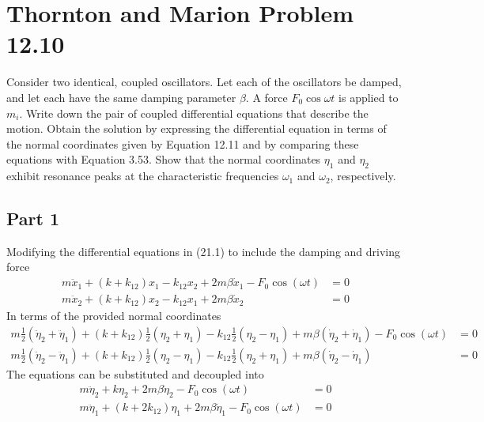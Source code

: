 \pagebreak
\section{Thornton and Marion Problem 12.10}
Consider two identical, coupled oscillators. Let each of the oscillators be damped, and let each have the same damping parameter $\beta$. A force $F_0\cos \omega t$ is applied to $m_i$. Write down the pair of coupled differential equations that describe the motion. Obtain the solution by expressing the differential equation in terms of the normal coordinates given by Equation 12.11 and by comparing these equations with Equation 3.53. Show that the normal coordinates $\eta_1$ and $\eta_2$ exhibit resonance peaks at the characteristic frequencies $\omega_1$ and $\omega_2$, respectively.

\subsection{Part 1}
Modifying the differential equations in (21.1) to include the damping and driving force
\begin{equation}
    \begin{split}
        m\ddot{x}_1 + (k+k_{12})x_1-k_{12}x_2+2m\beta\dot{x}_1-F_0 \cos (\omega t) &= 0\\
        m\ddot{x}_2 + (k+k_{12})x_2-k_{12}x_1+2m\beta\dot{x}_2 &= 0
    \end{split}
\end{equation}
In terms of the provided normal coordinates
\begin{equation}
    \begin{split}
        m\frac{1}{2}(\ddot{\eta}_2+\ddot{\eta}_1) + (k+k_{12})\frac{1}{2}(\eta_2+\eta_1)-k_{12}\frac{1}{2}(\eta_2-\eta_1)+m\beta(\dot{\eta}_2+\dot{\eta}_1)-F_0 \cos (\omega t) &= 0\\
        m\frac{1}{2}(\ddot{\eta}_2-\ddot{\eta}_1) + (k+k_{12})\frac{1}{2}(\eta_2-\eta_1)-k_{12}\frac{1}{2}(\eta_2+\eta_1)+m\beta(\dot{\eta}_2-\dot{\eta}_1) &= 0
    \end{split}
\end{equation}
The equations can be substituted and decoupled into
\begin{equation}
    \begin{split}
        m\ddot{\eta}_2 + k\eta_2 +2m\beta \dot{\eta}_2 -F_0 \cos(\omega t) &= 0\\
        m\ddot{\eta}_1 + (k + 2k_{12})\eta_1 + 2m\beta \dot{\eta}_1 - F_0 \cos(\omega t)&= 0
    \end{split}
\end{equation}
